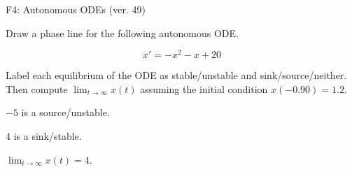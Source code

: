 \begin{exercise}
  \begin{exerciseTitle}F4: Autonomous ODEs (ver. 49)\end{exerciseTitle}
  \begin{exerciseStatement}
    

      Draw a phase line for the following 
      autonomous ODE.
    

    
\[x'= -x^{2} - x + 20\]

    

      Label each equilibrium of the ODE
      as stable/unstable and sink/source/neither.
      Then compute \(\lim_{t\to\infty}x(t)\)
      assuming the initial condition
      \(x( -0.90 )= 1.2\).
    

  \end{exerciseStatement}
  \begin{exerciseAnswer}
    

      \(-5\) is a source/unstable.
      
      \(4\) is a sink/stable.
    

    

      \(\lim_{t\to\infty}x(t)=4\).
    

  \end{exerciseAnswer}
\end{exercise}